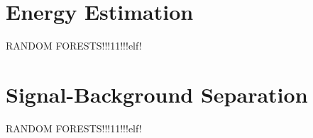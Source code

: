 \section{Energy Estimation}
%
RANDOM FORESTS!!!11!!!elf!

\section{Signal-Background Separation}
%
RANDOM FORESTS!!!11!!!elf!
